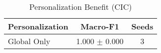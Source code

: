 \begin{table}[htbp]
\centering
\caption{Personalization Benefit (CIC)}\label{tab:pers_cic}
\begin{tabular}{lcc}
\toprule
Personalization & Macro-F1 & Seeds \\
\midrule
Global Only & 1.000 $\pm$ 0.000 & 3 \\
\bottomrule
\end{tabular}
\end{table}
